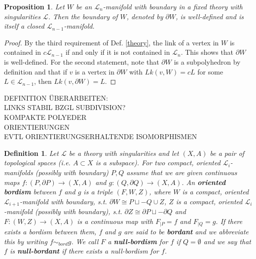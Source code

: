 \documentclass[11pt]{book}
\newtheorem{prop}{Proposition}
\newtheorem{definition}{Definition}
\begin{document}
\begin{prop}
Let $W$ be an $\mathcal{L}_n$-manifold with boundary in a fixed theory with singularities $\mathcal{L}$. Then the boundary of $W$, denoted by $\partial W$, is well-defined and is itself a closed $\mathcal{L}_{n-1}$-manifold.
\end{prop}

\begin{proof}
By the third requirement of Def. \ref{theory}, the link of a vertex in $W$ is contained in $c \mathcal{L}_{n-1}$ if and only if it is not contained in $\mathcal{L}_n$. This shows that $\partial W$ is well-defined. For the second statement, note that $\partial W$ is a subpolyhedron by definition and that if $v$ is a vertex in $\partial W$ with $Lk(v,W)=cL$ for some $L \in \mathcal{L}_{n-1}$, then $Lk(v,\partial W) = L$.
\end{proof}

DEFINITION ÜBERARBEITEN: \\
LINKS STABIL BZGL SUBDIVISION? \\
KOMPAKTE POLYEDER \\
ORIENTIERUNGEN \\
EVTL ORIENTIERUNGSERHALTENDE ISOMORPHISMEN 

\begin{definition}
Let $\mathcal{L}$ be a theory with singularities and let $(X,A)$ be a pair of topological spaces (i.e. $A \subset X$ is a subspace). For two compact, oriented $\mathcal{L}_i$-manifolds (possibly with boundary) $P,Q$  assume that we are given continuous maps $f:(P, \partial P) \to (X,A)$ and $g:(Q , \partial Q) \to (X,A)$. An \textbf{oriented bordism} between $f$ and $g$ is a triple $(F,W,Z)$, where $W$ is a compact, oriented $\mathcal{L}_{i+1}$-manifold with boundary, s.t. $\partial W \cong P \sqcup -Q \cup Z$, $Z$ is a compact, oriented $\mathcal{L}_i$-manifold (possibly with boundary), s.t. $\partial Z\cong \partial P \sqcup - \partial Q$ and $F: (W,Z) \to (X,A)$ is a continuous map with $F _{|P} = f$ and $F_{|Q}=g$. If there exists a bordism between them, $f$ and $g$ are said to be \textbf{bordant} and we abbreviate this by writing $f \sim_{bord} g$. We call $F$ a \textbf{null-bordism} for $f$ if $Q= \emptyset$ and we say that $f$ is \textbf{null-bordant} if there exists a null-bordism for $f$.
\end{definition}
\end{document}
